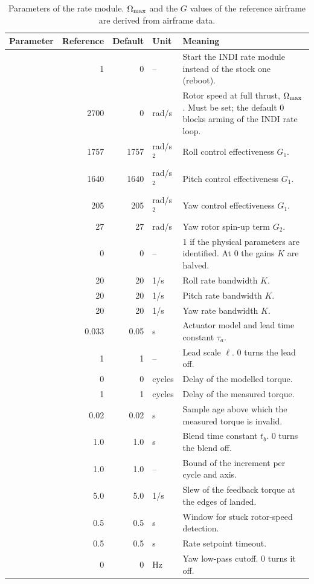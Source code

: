 \begin{table}[tbp]
\caption{Parameters of the rate module. $\Omax$ and the $G$ values of the reference airframe are derived from airframe data.}\label{tab:inner_params}
\centering
\small
\begin{tabularx}{\textwidth}{@{}L{3.5cm} r r l Y@{}}
\toprule
Parameter & Reference & Default & Unit & Meaning \\
\midrule
{} & 1 & 0 & -- & Start the INDI rate module instead of the stock one (reboot). \\
 & 2700 & 0 & rad/s & Rotor speed at full thrust, $\Omax$. Must be set; the default 0 blocks arming of the INDI rate loop. \\
 & 1757 & 1757 & rad/s$^2$ & Roll control effectiveness $G_1$. \\
 & 1640 & 1640 & rad/s$^2$ & Pitch control effectiveness $G_1$. \\
 & 205 & 205 & rad/s$^2$ & Yaw control effectiveness $G_1$. \\
 & 27 & 27 & rad/s & Yaw rotor spin-up term $G_2$. \\
 & 0 & 0 & -- & 1 if the physical parameters are identified. At 0 the gains $K$ are halved. \\
 & 20 & 20 & 1/s & Roll rate bandwidth $K$. \\
 & 20 & 20 & 1/s & Pitch rate bandwidth $K$. \\
 & 20 & 20 & 1/s & Yaw rate bandwidth $K$. \\
 & 0.033 & 0.05 & s & Actuator model and lead time constant $\tau_a$. \\
 & 1 & 1 & -- & Lead scale $\ell$. 0 turns the lead off. \\
 & 0 & 0 & cycles & Delay of the modelled torque. \\
 & 1 & 1 & cycles & Delay of the measured torque. \\
 & 0.02 & 0.02 & s & Sample age above which the measured torque is invalid. \\
 & 1.0 & 1.0 & s & Blend time constant $t_b$. 0 turns the blend off. \\
 & 1.0 & 1.0 & -- & Bound of the increment per cycle and axis. \\
 & 5.0 & 5.0 & 1/s & Slew of the feedback torque at the edges of landed. \\
 & 0.5 & 0.5 & s & Window for stuck rotor-speed detection. \\
 & 0.5 & 0.5 & s & Rate setpoint timeout. \\
 & 0 & 0 & Hz & Yaw low-pass cutoff. 0 turns it off. \\
\bottomrule
\end{tabularx}
\end{table}

